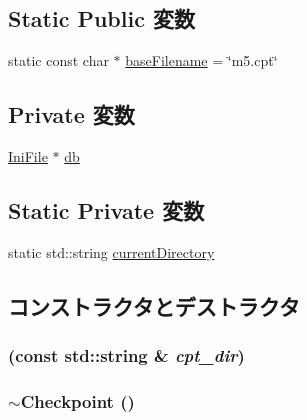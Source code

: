 \subsection*{Static Public 変数}
\begin{DoxyCompactItemize}
\item 
static const char $\ast$ \hyperlink{classCheckpoint_ad829fa8f586febadce60e760dba52a91}{baseFilename} = \char`\"{}m5.cpt\char`\"{}
\end{DoxyCompactItemize}
\subsection*{Private 変数}
\begin{DoxyCompactItemize}
\item 
\hyperlink{classIniFile}{IniFile} $\ast$ \hyperlink{classCheckpoint_aebb2ee2cd2d3bf87dbcc0880b4c55f00}{db}
\end{DoxyCompactItemize}
\subsection*{Static Private 変数}
\begin{DoxyCompactItemize}
\item 
static std::string \hyperlink{classCheckpoint_a2473a873b642e739c91a062766f8bcde}{currentDirectory}
\end{DoxyCompactItemize}


\subsection{コンストラクタとデストラクタ}
\hypertarget{classCheckpoint_a672da1b6013f19c435e227ce818013f2}{
\subsubsection[{Checkpoint}]{ (const std::string \& {\em cpt\_\-dir})}}
\label{classCheckpoint_a672da1b6013f19c435e227ce818013f2}
\hypertarget{classCheckpoint_a28d304cd3116ea8043354ce22989d2e6}{
\subsubsection[{$\sim$Checkpoint}]{\setlength{\rightskip}{0pt plus 5cm}$\sim${\bf Checkpoint} ()}}
\label{classCheckpoint_a28d304cd3116ea8043354ce22989d2e6}



